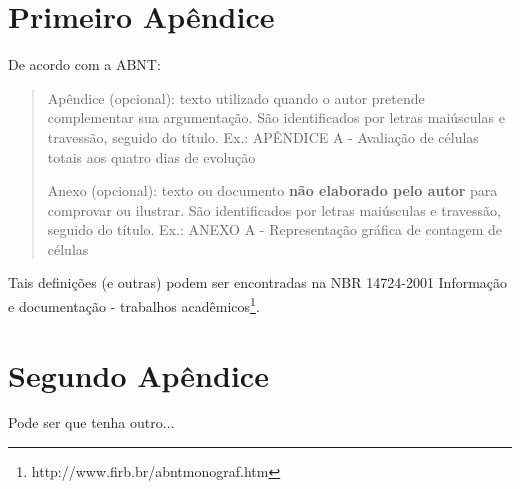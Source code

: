 \begin{apendicesenv}

\partapendices


\chapter{Primeiro Apêndice}

De acordo com a ABNT:

\begin{quotation}
Apêndice (opcional): texto utilizado quando o autor pretende complementar sua argumentação. São identificados por letras maiúsculas e travessão, seguido do título. Ex.: APÊNDICE A - Avaliação de células totais aos quatro dias de evolução

Anexo (opcional): texto ou documento \textbf{não elaborado pelo autor} para comprovar ou ilustrar. São identificados por letras maiúsculas e travessão, seguido do título. Ex.: ANEXO A - Representação gráfica de contagem de células
\end{quotation}

Tais definições (e outras) podem ser encontradas na NBR 14724-2001 Informação e documentação - trabalhos acadêmicos\footnote{http://www.firb.br/abntmonograf.htm}.


\chapter{Segundo Apêndice}

Pode ser que tenha outro...


\end{apendicesenv}
